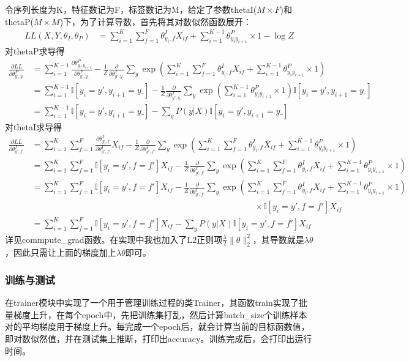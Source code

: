 \documentclass[a4paper,UTF8]{article}
\numberwithin{equation}{section}
\begin{document}
令序列长度为K，特征数记为F，标签数记为M，给定了参数thetaI($M\times F$)和thetaP($M\times M$)下，为了计算导数，首先将其对数似然函数展开：
\begin{align*}
	LL(X,Y,\theta_I,\theta_P) &= \sum_{i=1}^K\sum_{f=1}^F\theta^I_{y_i,f}X_{if}+ \sum_{i=1}^{K-1}\theta^P_{y_iy_{i+1}}\times 1-\log Z
\end{align*}
对thetaP求导得
\begin{align*}
	\frac{\partial LL}{\partial \theta^P_{y',y\_}} &=\sum_{i=1}^{K-1}\frac{\partial \theta^P_{y_i,y_{i+1}} }{\partial \theta^P_{y',y\_}}-\frac{1}{Z}\frac{\partial}{\partial \theta^I_{y',y\_}}\sum_y\exp(\sum_{i=1}^{K}\sum_{f=1}^F\theta^I_{y_i,f}X_{if}+ \sum_{i=1}^{K-1}\theta^P_{y_iy_{i+1}}\times 1)\\
	&=\sum_{i=1}^{K-1}\mathbb{I}[y_i=y',y_{i+1}=y\_]-\frac{1}{Z}\frac{\partial}{\partial \theta^I_{y',y\_}}\sum_y\exp(\sum_{i=1}^{K-1}\theta^P_{y_iy_{i+1}}\times 1)\mathbb{I}[y_i=y',y_{i+1}=y\_]\\
	&=\sum_{i=1}^{K-1}\mathbb{I}[y_i=y',y_{i+1}=y\_]-\sum_y P(y|X)\mathbb{I}[y_i=y',y_{i+1}=y\_]
\end{align*}
对thetaI求导得
\begin{align*}
	\frac{\partial LL}{\partial \theta^I_{y',f'}} &=\sum_{i=1}^K\sum_{f=1}^F\frac{\partial \theta^I_{y_i,f}}{\partial \theta^I_{y',f'}}X_{if}-\frac{1}{Z}\frac{\partial}{\partial \theta^I_{y',f'}}\sum_y\exp(\sum_{i=1}^K\sum_{f=1}^F\theta^I_{y_i,f}X_{if}+ \sum_{i=1}^{K-1}\theta^P_{y_iy_{i+1}}\times 1)\\
	&=\sum_{i=1}^K\sum_{f=1}^F\mathbb{I}[y_i=y',f=f']X_{if}-\frac{1}{Z}\frac{\partial }{\partial \theta^I_{y',f'}}\sum_y\exp(\sum_{i=1}^K\sum_{f=1}^F\theta^I_{y_i,f}X_{if}+ \sum_{i=1}^{K-1}\theta^P_{y_iy_{i+1}}\times 1)\\
	&=\sum_{i=1}^K\sum_{f=1}^F\mathbb{I}[y_i=y',f=f']X_{if}-\frac{1}{Z}\frac{\partial}{\partial \theta^I_{y',f'}}\sum_y\exp(\sum_{i=1}^K\sum_{f=1}^F\theta^I_{y_i,f}X_{if}+ \sum_{i=1}^{K-1}\theta^P_{y_iy_{i+1}}\times 1)\\
	&\qquad\qquad\qquad\qquad\qquad\qquad\qquad\qquad\qquad\qquad\qquad\qquad\qquad\times \mathbb{I}[y_i=y',f=f']X_{if}\\
	&=\sum_{i=1}^K\sum_{f=1}^F\mathbb{I}[y_i=y',f=f']X_{if}-\sum_y P(y|X)\mathbb{I}[y_i=y',f=f']X_{if}
\end{align*}
详见commpute\_grad函数。在实现中我也加入了L2正则项$\frac{\lambda}{2}\|\theta\|_2^2$，其导数就是$\lambda\theta$，因此只需让上面的梯度加上$\lambda \theta$即可。
\subsubsection{训练与测试}
在trainer模块中实现了一个用于管理训练过程的类Trainer，其函数train实现了批量梯度上升，在每个epoch中，先把训练集打乱，然后计算batch\_size个训练样本对的平均梯度用于梯度上升。每完成一个epoch后，就会计算当前的目标函数值，即对数似然值，并在测试集上推断，打印出accuracy。训练完成后，会打印出运行时间。
\end{document}
